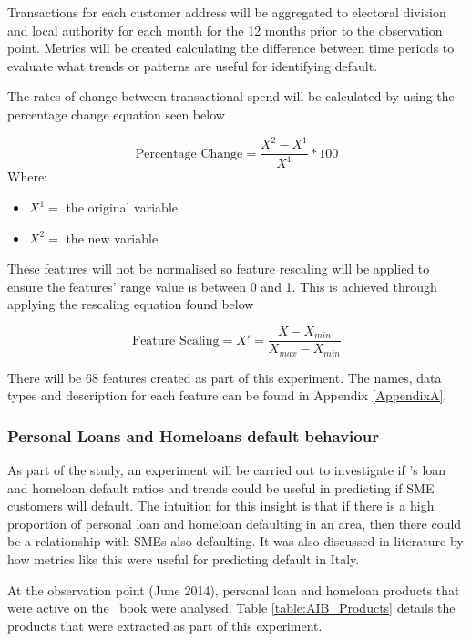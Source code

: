 Transactions for each customer address will be aggregated to electoral division and local authority for each month for the 12 months prior to the observation point. Metrics will be created calculating the difference between time periods to evaluate what trends or patterns are useful for identifying default. 

The rates of change between transactional spend will be calculated by using the percentage change equation seen below

\begin{equation} \label{eqn:PercentageChange}
\text{Percentage Change} = \frac{X^{2} - X^{1}}{X^{1}}*100  
\end{equation}
Where: 
\vspace{-7mm} 
\begin{itemize}
	\item $X^{1} = $ the original variable
	\item $X^{2} = $ the new variable
\end{itemize}

These features will not be normalised so feature rescaling will be applied to ensure the features' range value is between 0 and 1. This is achieved  through applying the rescaling equation found below  

\begin{equation}\label{eqn:rescaling}
\text{Feature Scaling} =  X' = \frac{X - X_{min}}{X_{max} - X_{min}}
\end{equation}

There will be 68 features created as part of this experiment. The names, data types and description for each feature can be found in Appendix \ref{AppendixA}.



\subsubsection{Personal Loans and Homeloans default behaviour}
As part of the study, an experiment will be carried out to investigate if \subjectname's loan and homeloan default ratios and trends could be useful in predicting if SME customers will default. The intuition for this insight is that if there is a high proportion of personal loan and homeloan defaulting in an area, then there could be a relationship with SMEs also defaulting. It was also discussed in literature by \cite{di_pietro_regional} how metrics like this were useful for predicting default in Italy.

At the observation point (June 2014), personal loan and homeloan products that were active on the \subjectname\ book were analysed. Table \ref{table:AIB_Products} details the products that were extracted as part of this experiment.

